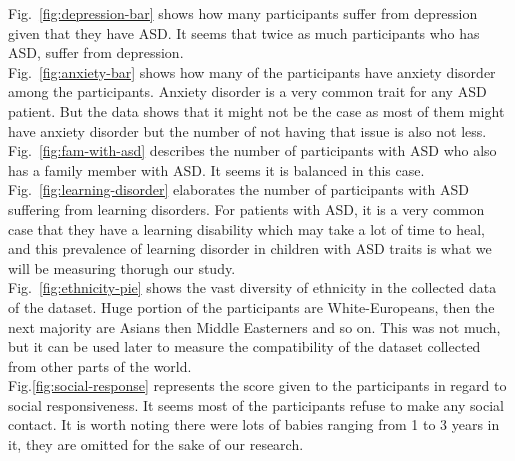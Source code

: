 \documentclass{article}
\begin{document}
    \begin{multicols}{2}
    \noindent
    \hspace*{\parindent}Fig.~\ref{fig:depression-bar} shows how many participants suffer from depression given that they have ASD. It seems that twice as much participants who has ASD, suffer from depression.\\
    
    \noindent
    \hspace*{\parindent}Fig.~\ref{fig:anxiety-bar} shows how many of the participants have anxiety disorder among the participants. Anxiety disorder is a very common trait for any ASD patient. But the data shows that it might not be the case as most of them might have anxiety disorder but the number of not having that issue is also not less.\\
    
    \noindent
    \hspace*{\parindent}Fig.~\ref{fig:fam-with-asd} describes the number of participants with ASD who also has a family member with ASD. It seems it is balanced in this case.\\
    
    \noindent
    \hspace*{\parindent}Fig.~\ref{fig:learning-disorder} elaborates the number of participants with ASD suffering from learning disorders. For patients with ASD, it is a very common case that they have a learning disability which may take a lot of time to heal, and this prevalence of learning disorder in children with ASD traits is what we will be measuring thorugh our study.\\
    
    \noindent
    \hspace*{\parindent}Fig.~\ref{fig:ethnicity-pie} shows the vast diversity of ethnicity in the collected data of the dataset. Huge portion of the participants are White-Europeans, then the next majority are Asians then Middle Easterners and so on. This was not much, but it can be used later to measure the compatibility of the dataset collected from other parts of the world.\\
    
    \noindent
    \hspace*{\parindent}Fig.\ref{fig:social-response} represents the score given to the participants in regard to social responsiveness. It seems most of the participants refuse to make any social contact. It is worth noting there were lots of babies ranging from 1 to 3 years in it, they are omitted for the sake of our research.\\

\end{multicols}
    
\end{document}

